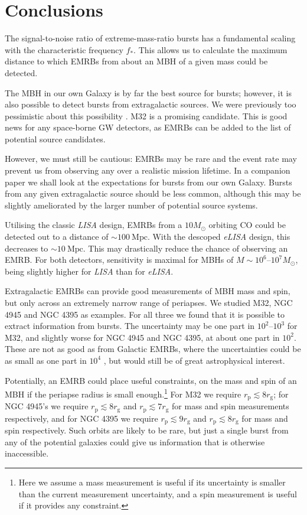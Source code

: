 \documentclass[useAMS,usedcolumn,usegraphicx,usenatbib]{mn2e}
\newcommand{\units}[1]{\ensuremath{~\mathrm{#1}}}
\newcommand{\sub}[1]{\ensuremath{_\mathrm{#1}}}
\begin{document}
\section{Conclusions}

The signal-to-noise ratio of extreme-mass-ratio bursts has a fundamental scaling with the characteristic frequency $f_\ast$. This allows us to calculate the maximum distance to which EMRBs from about an MBH of a given mass could be detected.

The MBH in our own Galaxy is by far the best source for bursts; however, it is also possible to detect bursts from extragalactic sources. We were previously too pessimistic about this possibility \citep{Berry2013}. M32 is a promising candidate. This is good news for any space-borne GW detectors, as EMRBs can be added to the list of potential source candidates.

However, we must still be cautious: EMRBs may be rare and the event rate may prevent us from observing any over a realistic mission lifetime. In a companion paper we shall look at the expectations for bursts from our own Galaxy. Bursts from any given extragalactic source should be less common, although this may be slightly ameliorated by the larger number of potential source systems.

Utilising the classic \textit{LISA} design, EMRBs from a $10 M_\odot$ orbiting CO could be detected out to a distance of $\sim 100\units{Mpc}$. With the descoped \textit{eLISA} design, this decreases to $\sim 10\units{Mpc}$. This may drastically reduce the chance of observing an EMRB. For both detectors, sensitivity is maximal for MBHs of $M \sim 10^6$--$10^7 M_\odot$, being slightly higher for \textit{LISA} than for \textit{eLISA}.

Extragalactic EMRBs can provide good measurements of MBH mass and spin, but only across an extremely narrow range of periapses. We studied M32, NGC 4945 and NGC 4395 as examples. For all three we found that it is possible to extract information from bursts. The uncertainty may be one part in $10^2$--$10^3$ for M32, and slightly worse for NGC 4945 and NGC 4395, at about one part in $10^2$. These are not as good as from Galactic EMRBs, where the uncertainties could be as small as one part in $10^4$ \citep{Berry2013}, but would still be of great astrophysical interest.

Potentially, an EMRB could place useful constraints, on the mass and spin of an MBH if the periapse radius is small enough.\footnote{Here we assume a mass measurement is useful if its uncertainty is smaller than the current measurement uncertainty, and a spin measurement is useful if it provides any constraint.} For M32 we require $r\sub{p} \lesssim 8 r\sub{g}$; for NGC 4945's we require $r\sub{p} \lesssim 8 r\sub{g}$ and $r\sub{p} \lesssim 7 r\sub{g}$ for mass and spin measurements respectively, and for NGC 4395 we require $r\sub{p} \lesssim 9 r\sub{g}$ and $r\sub{p} \lesssim 8 r\sub{g}$ for mass and spin respectively. Such orbits are likely to be rare, but just a single burst from any of the potential galaxies could give us information that is otherwise inaccessible.
\end{document}
